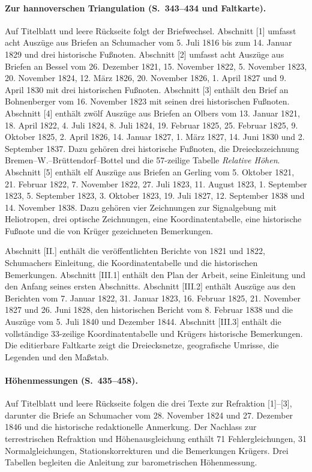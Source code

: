 \paragraph{Zur hannoverschen Triangulation (S.~343--434 und Faltkarte).}
Auf Titelblatt und leere Rückseite folgt der Briefwechsel. Abschnitt [1] umfasst acht Auszüge aus Briefen an Schumacher vom 5. Juli 1816 bis zum 14. Januar 1829 und drei historische Fußnoten. Abschnitt [2] umfasst acht Auszüge aus Briefen an Bessel vom 26. Dezember 1821, 15. November 1822, 5. November 1823, 20. November 1824, 12. März 1826, 20. November 1826, 1. April 1827 und 9. April 1830 mit drei historischen Fußnoten. Abschnitt [3] enthält den Brief an Bohnenberger vom 16. November 1823 mit seinen drei historischen Fußnoten. Abschnitt [4] enthält zwölf Auszüge aus Briefen an Olbers vom 13. Januar 1821, 18. April 1822, 4. Juli 1824, 8. Juli 1824, 19. Februar 1825, 25. Februar 1825, 9. Oktober 1825, 2. April 1826, 14. Januar 1827, 1. März 1827, 14. Juni 1830 und 2. September 1837. Dazu gehören drei historische Fußnoten, die Dreieckszeichnung Bremen--W.--Brüttendorf--Bottel und die 57-zeilige Tabelle \textit{Relative Höhen}. Abschnitt [5] enthält elf Auszüge aus Briefen an Gerling vom 5. Oktober 1821, 21. Februar 1822, 7. November 1822, 27. Juli 1823, 11. August 1823, 1. September 1823, 5. September 1823, 3. Oktober 1823, 19. Juli 1827, 12. September 1838 und 14. November 1838. Dazu gehören vier Zeichnungen zur Signalgebung mit Heliotropen, drei optische Zeichnungen, eine Koordinatentabelle, eine historische Fußnote und die von Krüger gezeichneten Bemerkungen.

Abschnitt [II.] enthält die veröffentlichten Berichte von 1821 und 1822, Schumachers Einleitung, die Koordinatentabelle und die historischen Bemerkungen. Abschnitt [III.1] enthält den Plan der Arbeit, seine Einleitung und den Anfang seines ersten Abschnitts. Abschnitt [III.2] enthält Auszüge aus den Berichten vom 7. Januar 1822, 31. Januar 1823, 16. Februar 1825, 21. November 1827 und 26. Juni 1828, den historischen Bericht vom 8. Februar 1838 und die Auszüge vom 5. Juli 1840 und Dezember 1844. Abschnitt [III.3] enthält die vollständige 33-zeilige Koordinatentabelle und Krügers historische Bemerkungen. Die editierbare Faltkarte zeigt die Dreiecksnetze, geografische Umrisse, die Legenden und den Maßstab.

\paragraph{Höhenmessungen (S.~435--458).}
Auf Titelblatt und leere Rückseite folgen die drei Texte zur Refraktion [1]--[3], darunter die Briefe an Schumacher vom 28. November 1824 und 27. Dezember 1846 und die historische redaktionelle Anmerkung. Der Nachlass zur terrestrischen Refraktion und Höhenausgleichung enthält 71 Fehlergleichungen, 31 Normalgleichungen, Stationskorrekturen und die Bemerkungen Krügers. Drei Tabellen begleiten die Anleitung zur barometrischen Höhenmessung.


